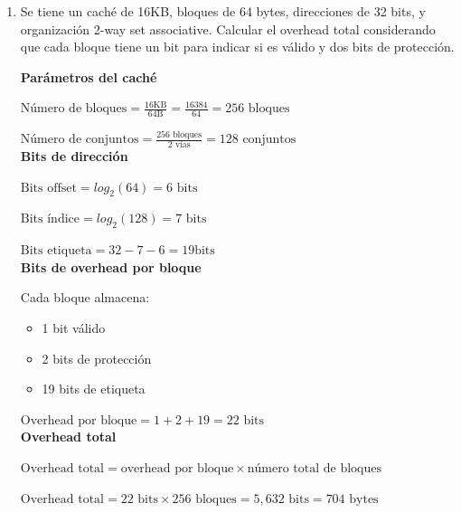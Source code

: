 \documentclass[a4paper, 11pt]{article}
\newcommand{\Aspace}{0.2cm}
\begin{document}
\begin{enumerate}
\newpage
\item Se tiene un caché de 16KB, bloques de 64 bytes, direcciones de 32 bits, y organización 2-way set associative. Calcular el overhead total considerando que cada bloque tiene un bit para indicar si es válido y dos bits de protección. \par
    \vspace{\Aspace} \par
    { \color{azul}
        \textbf{Parámetros del caché} \par
        $\text{Número de bloques} = \frac{16 \text{KB}}{64 \text{B}} = \frac{16384}{64} = 256 \text{ bloques}$ \par
        $\text{Número de conjuntos} = \frac{256 \text{ bloques}}{2 \text{ vías}} = 128 \text{ conjuntos}$ \\

        \textbf{Bits de dirección} \par
        $\text{Bits offset} = log_{2}(64) = 6 \text{ bits}$ \par
        $\text{Bits índice} = log_{2}(128) = 7 \text{ bits}$ \par
        $\text{Bits etiqueta} = 32 - 7 - 6 = 19 \text{bits}$ \\

        \textbf{Bits de overhead por bloque} \par
        Cada bloque almacena:
        \vspace{-0.2cm}
        \begin{itemize}
            \item 1 bit válido
            \item 2 bits de protección
            \item 19 bits de etiqueta
        \end{itemize}
        $\text{Overhead por bloque} = 1 + 2 + 19 = 22 \text{ bits}$ \\

        \textbf{Overhead total} \par
        $\text{Overhead total} = \text{overhead por bloque} \times \text{número total de bloques}$ \par
        $\text{Overhead total} = 22 \text{ bits} \times 256 \text{ bloques} = 5,632 \text{ bits} = 704 \text{ bytes}$
    }
\end{enumerate}
\end{document}
